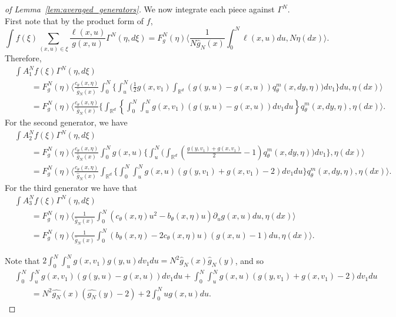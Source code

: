 \documentclass[EJP]{ejpecp} %
\renewcommand{\hat}{\widehat}
\newcommand{\IR}{\mathbb R}
\newcommand{\lp}{\xi}              %
\begin{document}
\begin{proof}[of Lemma~\ref{lem:averaged_generators}]
We now integrate each piece against $\Gamma^N$.
First note that by the product form of $f$,
$$
    \int f(\lp) \sum_{(x,u)\in\lp} \frac{\ell(x,u)}{g(x,u)} \Gamma^N(\eta,d\lp)
    =
    F_g^N(\eta) \bigg\langle
        \frac{1}{N \hat g_N(x)} \int_0^N \ell(x,u) du,
        N \eta(dx)
    \bigg\rangle .
$$
Therefore,
\footnotesize
\begin{align*}
&
    \int A^N_1f(\lp) \Gamma^N(\eta,d\lp) 
\\ &\qquad =
    F_g^N(\eta) \bigg\langle \frac{c_\theta(x,\eta)}{\hat g_N(x)} \int_0^N \Bigg\{
        \int_u^N \Bigg(
            \frac{1}{2} g(x,v_1) \int_{\IR^d}(g(y,u)-g(x,u))q^m_{\theta}(x,dy,\eta)
        \Bigg) dv_1
    \Bigg\} du, \eta(dx) \bigg \rangle
\\ &\qquad =
    F_g^N(\eta) \bigg\langle \frac{c_\theta(x,\eta)}{\hat g_N(x)} \Bigg\{
    \int_{\IR^d} \left\{
        \int_{0}^{N} \int_u^N g(x,v_1) (g(y,u)-g(x,u)) dv_1 du
    \right\} q^m_{\theta}(x,dy,\eta)
    , \eta(dx) \bigg \rangle .
\end{align*}
\normalsize
For the second generator, we have
\footnotesize
\begin{align*}
&
    \int A^N_2 f(\lp) \Gamma^N(\eta, d\lp)
\\ &\qquad =
    F_g^N(\eta) \bigg\langle \frac{c_\theta(x,\eta)}{\hat g_N(x)} \int_0^N g(x, u) \Bigg\{
        \int_u^N\Bigg(\int_{\IR^d}
        \left(\frac{g(y,v_1)+g(x,v_1)}{2}-1\right) q^m_{\theta}(x,dy,\eta)
        \Bigg)dv_1 \Bigg\}
    , \eta(dx) \bigg\rangle
\\ &\qquad =
    F_g^N(\eta) \bigg\langle \frac{c_\theta(x,\eta)}{\hat g_N(x)}
    \int_{\IR^d}\Bigg\{ \int_{0}^{N}
    \int_u^N g(x,u) \left(
        g(y,v_1)+g(x,v_1)-2
    \right) dv_1 du\Bigg\} q^m_{\theta}(x,dy,\eta)
    , \eta(dx) \bigg\rangle .
\end{align*}  
\normalsize
For the third generator we have that
\begin{align*}
&
    \int A^N_3f(\xi)\Gamma^N(\eta,d\lp)
\\ & \qquad =
    F_g^N(\eta) \bigg\langle \frac{1}{\hat g_N(x)}
    \int_0^N
        \left( c_\theta(x,\eta) u^2 - b_\theta(x,\eta) u \right) \partial_u g(x,u)
    du
    , \eta(dx) \bigg\rangle 
\\ & \qquad =
    F_g^N(\eta) \bigg\langle \frac{1}{\hat g_N(x)}
    \int_0^N
        \left( b_\theta(x,\eta) - 2 c_\theta(x,\eta) u \right) (g(x,u) - 1)
    du
    , \eta(dx) \bigg\rangle .
\end{align*}

Note that $2 \int_0^N \int_u^N g(x,v_1) g(y,u) dv_1 du = N^2 \hat g_N(x) \hat g_N(y)$,
and so
\begin{align*}
&
    \int_{0}^{N} \int_u^N g(x,v_1) (g(y,u)-g(x,u)) dv_1 du
    + \int_{0}^{N} \int_u^N g(x,u) \left(g(y,v_1)+g(x,v_1)-2\right)dv_1 du
\\ &\qquad = 
    N^2 \hat{g_N}(x)(\hat{g_N}(y) - 2) + 2\int_{0}^{N} u g(x,u) du.
\end{align*}


\end{proof}
\end{document}
